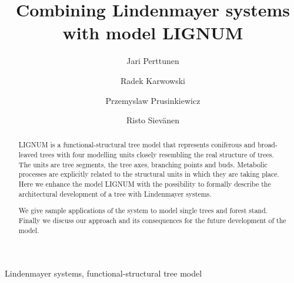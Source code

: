 \documentclass{elsart}
\begin{document}
\begin{frontmatter}


\title{Combining Lindenmayer systems with model LIGNUM}
\author[Metla]{Jari Perttunen}
\author[Calgary]{Radek Karwowski}
\author[Calgary]{Przemyslaw Prusinkiewicz}
\author[Metla]{Risto Siev\"anen}

\address[Metla]{Finnish Forest Research Insititute. Vantaa Research Station. 
                              Jokiniemenkuja 1. PL 18. 01301 Vantaa. Finland.}
\address[Calgary]{University of Calgary}




\begin{abstract}
  LIGNUM  is  a   functional-structural  tree  model  that  represents
  coniferous and broad-leaved trees  with four modelling units closely
  resembling  the  real  structure  of  trees.   The  units  are  tree
  segments,  the  tree axes,  branching  points  and buds.   Metabolic
  processes are  explicitly related to  the structural units  in which
  they are  taking place.  Here we  enhance the model  LIGNUM with the
  possibility to formally describe  the architectural development of a
  tree with Lindenmayer systems.
  
  We give sample applications of  the system to model single trees and
  forest stand.  Finally we discuss our approach  and its consequences
  for the future development of the model.
\end{abstract}

\begin{keyword}

 Lindenmayer systems, functional-structural tree model


\end{keyword}

\end{frontmatter}







\end{document}

